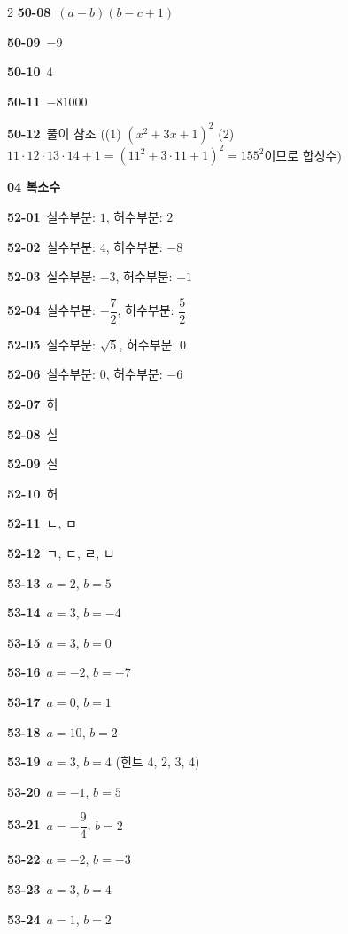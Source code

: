 \documentclass[10pt,a4paper]{article}
\begin{document}
\begin{multicols}{2}
\noindent\textbf{50-08}\ $(a-b)(b-c+1)$\par
\noindent\textbf{50-09}\ $-9$\par
\noindent\textbf{50-10}\ $4$\par
\noindent\textbf{50-11}\ $-81000$\par
\noindent\textbf{50-12}\ 풀이 참조 ((1) $(x^2+3x+1)^2$ (2) $11\cdot 12\cdot 13\cdot 14+1=(11^2+3\cdot 11+1)^2=155^2$이므로 합성수)\par
\noindent\textbf{04 복소수}\par\smallskip
\noindent\textbf{52-01}\ 실수부분: $1$, 허수부분: $2$\par
\noindent\textbf{52-02}\ 실수부분: $4$, 허수부분: $-8$\par
\noindent\textbf{52-03}\ 실수부분: $-3$, 허수부분: $-1$\par
\noindent\textbf{52-04}\ 실수부분: $-\dfrac{7}{2}$, 허수부분: $\dfrac{5}{2}$\par
\noindent\textbf{52-05}\ 실수부분: $\sqrt{5}$, 허수부분: $0$\par
\noindent\textbf{52-06}\ 실수부분: $0$, 허수부분: $-6$\par
\noindent\textbf{52-07}\ 허\par
\noindent\textbf{52-08}\ 실\par
\noindent\textbf{52-09}\ 실\par
\noindent\textbf{52-10}\ 허\par
\noindent\textbf{52-11}\ ㄴ, ㅁ\par
\noindent\textbf{52-12}\ ㄱ, ㄷ, ㄹ, ㅂ\par
\noindent\textbf{53-13}\ $a=2$, $b=5$\par
\noindent\textbf{53-14}\ $a=3$, $b=-4$\par
\noindent\textbf{53-15}\ $a=3$, $b=0$\par
\noindent\textbf{53-16}\ $a=-2$, $b=-7$\par
\noindent\textbf{53-17}\ $a=0$, $b=1$\par
\noindent\textbf{53-18}\ $a=10$, $b=2$\par
\noindent\textbf{53-19}\ $a=3$, $b=4$ (힌트 $4$, $2$, $3$, $4$)\par
\noindent\textbf{53-20}\ $a=-1$, $b=5$\par
\noindent\textbf{53-21}\ $a=-\dfrac{9}{4}$, $b=2$\par
\noindent\textbf{53-22}\ $a=-2$, $b=-3$\par
\noindent\textbf{53-23}\ $a=3$, $b=4$\par
\noindent\textbf{53-24}\ $a=1$, $b=2$\par

\end{multicols}
\end{document}
